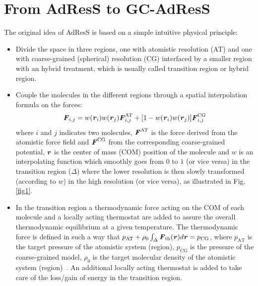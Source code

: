 \documentclass[a4paper,preprint,unsortedaddress]{revtex4-1}
\newcommand{\recheck}[1]{{\color{red} #1}}
\newcommand{\vect}[1]{\textbf{\textit{#1}}}
\newcommand{\AT}{{\textrm{{AT}}}}
\newcommand{\CG}{{\textrm{CG}}}
\newcommand{\thf}{{\textrm{th}}}
\begin{document}
\section{From AdResS to GC-AdResS}
The original idea of AdResS is based on a simple intuitive physical principle:
\begin{itemize}
\item Divide the space in three regions, one with atomistic resolution (AT) and one with coarse-grained (spherical) resolution (CG) interfaced by a smaller region with an hybrid treatment, which is usually called transition region or hybrid region.
\item Couple the molecules in the different regions through a spatial interpolation formula on the forces:
\begin{equation}
{\vect F}_{i,j}=w(\vect r_i)w(\vect r_j){\vect
  F}_{i,j}^{\AT}+[1-w(\vect r_i)w(\vect r_j)]{\vect F}^{\CG}_{i,j} 
\label{eqforce}
\end{equation}
where $i$ and $j$ indicates two molecules, ${\vect F}^{\AT}$ is the
force derived from the atomistic force field and  ${\vect F}^{\CG}$
from the corresponding coarse-grained potential, \recheck{$\vect r$ is the center of mass (COM) position of}
the molecule and $w$ is an interpolating function which smoothly goes from $0$
to $1$ (or vice versa) in the transition region ($\Delta$) where the lower resolution is then
slowly transformed (according to $w$) in the high resolution (or vice versa),
as illustrated in Fig.\ref{fig1}.
\item In the transition region a thermodynamic force acting on the COM of each molecule and a locally acting thermostat are added to assure the overall thermodynamic equilibrium at a given temperature. The thermodynamic force is defined in such a way that
  $p_{\AT}+\rho_{0}\int_{\Delta}{\vect F}_{\thf}({\vect r})d{\vect r}=p_{\CG}$,
  where $p_{\AT}$  is the target pressure of the atomistic system (region), $p_{\CG}$ is the pressure of the coarse-grained model, $\rho_{0}$ is the target molecular density of the atomistic system (region)~\cite{prl12}. An additional locally acting thermostat is added to take care of the loss/gain of energy in the transition region.
\end{itemize}
\end{document}
